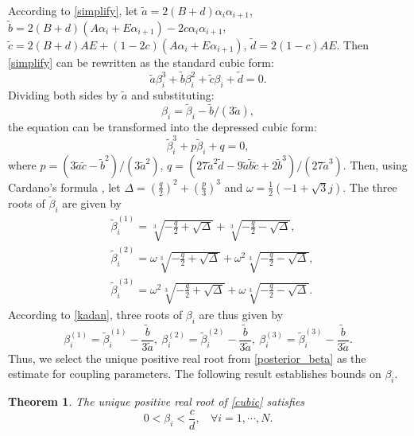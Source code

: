 \documentclass[lettersize,journal]{IEEEtran}
\newtheorem{theorem}{Theorem}
\theoremstyle{remark}
\begin{document}
According to \eqref{simplify}, let $\tilde{a}=2(B+d)\alpha_i\alpha_{i+1}$, $\tilde{b} =2(B+d)(A\alpha_i+E\alpha_{i+1})-2c\alpha_i \alpha_{i+1}$, $\tilde{c} = 2(B+d)AE+(1-2c)(A\alpha_i +E \alpha_{i+1})$, $\tilde{d}=2(1-c)AE $. 
Then \eqref{simplify} can be rewritten as the standard cubic form:
\begin{equation*}
	\tilde{a} \beta_i^3 + \tilde{b} \beta_i^2 + \tilde{c} \beta_i + \tilde{d} = 0.
\end{equation*}
Dividing both sides by \(\tilde{a}\) and substituting:
\begin{equation}
\beta_i = \tilde{\beta}_i - \tilde{b}/(3\tilde{a}), \label{kadan}
\end{equation}
the equation can be transformed into the depressed cubic form:
\begin{equation*}
\tilde{\beta}_i^3 + p \tilde{\beta}_i + q = 0,
\end{equation*}
where $p=(3\tilde{a}\tilde{c}-\tilde{b}^2)/(3\tilde{a}^2)$, $q=(27\tilde{a}^2\tilde{d}-9\tilde{a}\tilde{b}\tilde{c}+2\tilde{b}^3)/(27\tilde{a}^3)$. Then, using Cardano's formula \cite{abramowitz1965handbook}, let $\Delta = \left(\frac{q}{2}\right)^2 + \left(\frac{p}{3}\right)^3$ and $\omega =\frac{1}{2}(-1+\sqrt{3}j)$. The three roots of $\tilde{\beta}_i$ are given by
	\begin{align}
		&\tilde{\beta}_i^{(1)}=\sqrt[3]{-\frac{q}{2}+\sqrt{\Delta}}+\sqrt[3]{-\frac{q}{2}-\sqrt{\Delta}}, \\
		&\tilde{\beta}_i^{(2)}=\omega \sqrt[3]{-\frac{q}{2}+\sqrt{\Delta}}+\omega^2 \sqrt[3]{-\frac{q}{2}-\sqrt{\Delta}} ,\\
	&	\tilde{\beta}_i^{(3)}=\omega^2 \sqrt[3]{-\frac{q}{2}+\sqrt{\Delta}}+\omega \sqrt[3]{-\frac{q}{2}-\sqrt{\Delta}}.
	\end{align}
According to \eqref{kadan}, three roots of $\beta_i$ are thus given by
\begin{equation}
\beta_i^{(1)} = \tilde{\beta}_i^{(1)}-\frac{\tilde{b}}{3\tilde{a}},~
\beta_i^{(2)} = \tilde{\beta}_i^{(2)}-\frac{\tilde{b}}{3\tilde{a}}, ~
\beta_i^{(3)} = \tilde{\beta}_i^{(3)}-\frac{\tilde{b}}{3\tilde{a}}. \label{posterior_beta}
\end{equation}
Thus, we select the unique positive real root from \eqref{posterior_beta} as the estimate for coupling parameters.
The following result establishes bounds on $\beta_i$.
\begin{theorem}\label{Thm2}
	The unique positive real root of  \eqref{cubic} satisfies 
	\begin{equation}
		0 < \beta_i < \frac{c}{d}, ~~~~\forall i=1,\cdots,N.
	\end{equation}
\end{theorem}
\end{document}
